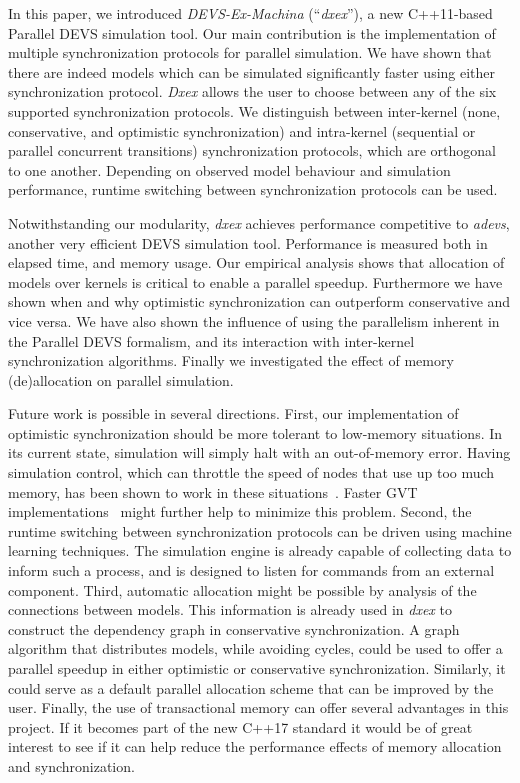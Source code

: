 In this paper, we introduced \textit{DEVS-Ex-Machina} (``\textit{dxex}''), a new C++11-based \textsf{Parallel DEVS} simulation tool.
Our main contribution is the implementation of multiple synchronization protocols for parallel simulation.
We have shown that there are indeed models which can be simulated significantly faster using either synchronization protocol.
\textit{Dxex} allows the user to choose between any of the six supported synchronization protocols.
We distinguish between inter-kernel (none, conservative, and optimistic synchronization) and intra-kernel (sequential or parallel concurrent transitions) synchronization protocols, which are orthogonal to one another.
Depending on observed model behaviour and simulation performance, runtime switching between synchronization protocols can be used.

Notwithstanding our modularity, \textit{dxex} achieves performance competitive to \textit{adevs}, another very efficient \textsf{DEVS} simulation tool.
Performance is measured both in elapsed time, and memory usage.
Our empirical analysis shows that allocation of models over kernels is critical to enable a parallel speedup.
Furthermore we have shown when and why optimistic synchronization can outperform conservative and vice versa.
We have also shown the influence of using the parallelism inherent in the Parallel DEVS formalism, and its interaction with inter-kernel synchronization algorithms.
Finally we investigated the effect of memory (de)allocation on parallel simulation. 

Future work is possible in several directions.
First, our implementation of optimistic synchronization should be more tolerant to low-memory situations.
In its current state, simulation will simply halt with an out-of-memory error.
Having simulation control, which can throttle the speed of nodes that use up too much memory, has been shown to work in these situations~\cite{FujimotoBook}.
Faster GVT implementations~\cite{Fujimoto:1997:CGV:268403.268404,Bauer:2005:SND:1069810.1070159} might further help to minimize this problem.
Second, the runtime switching between synchronization protocols can be driven using machine learning techniques.
The simulation engine is already capable of collecting data to inform such a process, and is designed to listen for commands from an external component.
Third, automatic allocation might be possible by analysis of the connections between models.
This information is already used in \textit{dxex} to construct the dependency graph in conservative synchronization.
A graph algorithm that distributes models, while avoiding cycles, could be used to offer a parallel speedup in either optimistic or conservative synchronization.
Similarly, it could serve as a default parallel allocation scheme that can be improved by the user.
Finally, the use of transactional memory can offer several advantages in this project.
If it becomes part of the new C++17 standard it would be of great interest to see if it can help reduce the performance effects of memory allocation and synchronization.
